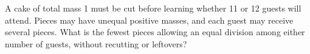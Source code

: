 A cake of total mass 1 must be cut before learning whether 11 or 12 guests will attend. Pieces may have unequal positive masses, and each guest may receive several pieces. What is the fewest pieces allowing an equal division among either number of guests, without recutting or leftovers?
